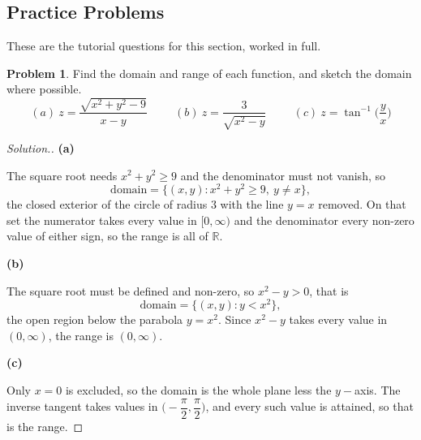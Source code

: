 \documentclass[11pt,a4paper]{article}
\theoremstyle{definition}
\newtheorem{problemx}{Problem}[subsection]
\newenvironment{problem}{\begin{problemx}}{\end{problemx}}
\newenvironment{solution}
  {\renewcommand{\qedsymbol}{}\begin{proof}[\textit{Solution}.]}
  {\end{proof}}
\newcommand{\subhead}[1]{%
  \par\medskip\noindent\textbf{#1}\par\nobreak\smallskip}
\begin{document}
\subsection{Practice Problems}

These are the tutorial questions for this section, worked in full.

\begin{problem}
Find the domain and range of each function, and sketch the domain where
possible.
$$(a)\ z = \frac{\sqrt{x^2+y^2-9}}{x-y}\hspace{1cm}
(b)\ z = \frac{3}{\sqrt{x^2-y}}\hspace{1cm}
(c)\ z = \tan^{-1}\Big(\frac{y}{x}\Big)$$
\end{problem}
\begin{solution}
\subhead{(a)}
The square root needs $x^2+y^2\geq 9$ and the denominator must not vanish, so
$$\text{domain} = \big\{(x,y): x^2+y^2\geq 9,\ y\neq x\big\},$$
the closed exterior of the circle of radius $3$ with the line $y=x$ removed. On
that set the numerator takes every value in $[0,\infty)$ and the denominator
every non-zero value of either sign, so the range is all of $\mathbb{R}$.

\subhead{(b)}
The square root must be defined and non-zero, so $x^2-y>0$, that is
$$\text{domain} = \big\{(x,y): y < x^2\big\},$$
the open region below the parabola $y = x^2$. Since $x^2-y$ takes every value in
$(0,\infty)$, the range is $(0,\infty)$.

\subhead{(c)}
Only $x=0$ is excluded, so the domain is the whole plane less the $y-$axis. The
inverse tangent takes values in $\Big(-\dfrac{\pi}{2}, \dfrac{\pi}{2}\Big)$, and
every such value is attained, so that is the range.
\end{solution}
\end{document}
